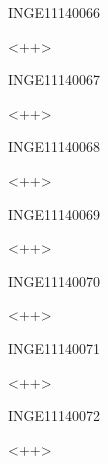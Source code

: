 \documentclass{article}
\begin{document}
\begin{corrige}{INGE11140066}

<++>

\end{corrige}%


\begin{corrige}{INGE11140067}

<++>

\end{corrige}%


\begin{corrige}{INGE11140068}

<++>

\end{corrige}%


\begin{corrige}{INGE11140069}

<++>

\end{corrige}%


\begin{corrige}{INGE11140070}

<++>

\end{corrige}%


\begin{corrige}{INGE11140071}

<++>

\end{corrige}%


\begin{corrige}{INGE11140072}

<++>

\end{corrige}%
\end{document}

